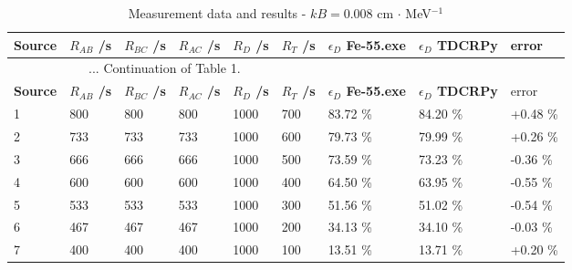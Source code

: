 \documentclass[12pt]{iopart}
\begin{document}
\begingroup
\footnotesize
\begin{longtable}[l]{| p{} | p{} | p{} | p{} | p{} | p{} |p{} |p{} |p{} |} 
\caption{Measurement data and results - $kB = 0.008$ cm $\cdot$ MeV$^{-1}$}
\label{Table1} \\ 
\hline
\textbf{Source} & \textbf{$R_{AB}$ /s} & \textbf{$R_{BC}$ /s} & \textbf{$R_{AC}$ /s} & \textbf{$R_{D}$ /s} & \textbf{$R_{T}$ /s} & \textbf{$\epsilon_{D}$ Fe-55.exe} & \textbf{$\epsilon_{D}$ TDCRPy} & error \\ 
\endfirsthead
\multicolumn{6}{c}{... Continuation of Table 1.}\\ 
\hline
 \textbf{Source} & \textbf{$R_{AB}$ /s} & \textbf{$R_{BC}$ /s} & \textbf{$R_{AC}$ /s} & \textbf{$R_{D}$ /s} & \textbf{$R_{T}$ /s} & \textbf{$\epsilon_{D}$ Fe-55.exe} & \textbf{$\epsilon_{D}$ TDCRPy} & error \\   \hline 
\endhead
\hline
 1 & 800    & 800     & 800    & 1000    &  700   &  83.72 \% &  84.20 \% &  +0.48 \% \\
 2 & 733    & 733     & 733    & 1000    &  600   &  79.73 \% &  79.99 \% &  +0.26 \% \\
 3 & 666    & 666     & 666    & 1000    &  500   &  73.59 \% &  73.23 \% &  -0.36 \% \\
 4 & 600    & 600     & 600    & 1000    &  400   &  64.50 \% &  63.95 \% &  -0.55 \% \\
 5 & 533    & 533     & 533    & 1000    &  300   &  51.56 \% &  51.02 \% &  -0.54 \% \\
 6 & 467    & 467     & 467    & 1000    &  200   &  34.13 \% &  34.10 \% &  -0.03 \% \\
 7 & 400    & 400     & 400    & 1000    &  100   &  13.51 \% &  13.71 \% &  +0.20 \% \\
\hline
\end{longtable} 
\endgroup

\pagebreak
\end{document}
